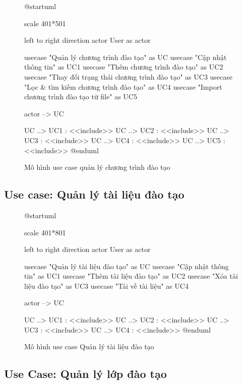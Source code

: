 \documentclass[report.tex]{subfiles}
\begin{document}
\begin{figure}[!ht]
\caption{Mô hình use case quản lý chương trình đào tạo}
\begin{plantuml}

@startuml

scale 401*501

left to right direction
actor User as actor

usecase "Quản lý chương trình đào tạo" as UC
usecase "Cập nhật thông tin" as UC1
usecase "Thêm chương trình đào tạo" as UC2
usecase "Thay đổi trạng thái chương trình đào tạo" as UC3
usecase "Lọc & tìm kiếm chương trình đào tạo" as UC4
usecase "Import chương trình đào tạo từ file" as UC5

actor --> UC

UC ..> UC1 : <<include>>
UC ..> UC2 : <<include>>
UC ..> UC3 : <<include>>
UC ..> UC4 : <<include>>
UC ..> UC5 : <<include>>
@enduml
\end{plantuml}
\end{figure}
\FloatBarrier

\subsection{Use case: Quản lý tài liệu đào tạo}

\begin{figure}[!ht]
\caption{Mô hình use case Quản lý tài liệu đào tạo}
\begin{plantuml}

@startuml

scale 401*801

left to right direction
actor User as actor

usecase "Quản lý tài liệu đào tạo" as UC
usecase "Cập nhật thông tin" as UC1
usecase "Thêm tài liệu đào tạo" as UC2
usecase "Xóa tài liệu đào tạo" as UC3
usecase "Tải về tài liệu" as UC4

actor --> UC

UC ..> UC1 : <<include>>
UC ..> UC2 : <<include>>
UC ..> UC3 : <<include>>
UC ..> UC4 : <<include>>
@enduml
\end{plantuml}
\end{figure}
\FloatBarrier

\subsection{Use Case: Quản lý lớp đào tạo}
\end{document}
